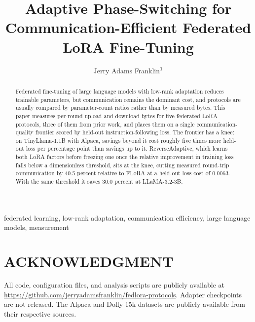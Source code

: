 \documentclass{ieeetj}
\def\authorrefmark#1{\ensuremath{^{\textbf{#1}}}}
\begin{document}

\title{Adaptive Phase-Switching for Communication-Efficient Federated LoRA Fine-Tuning}

\author{Jerry Adams Franklin\authorrefmark{1}}

\begin{abstract}
Federated fine-tuning of large language models with low-rank adaptation reduces trainable parameters, but communication remains the dominant cost, and protocols are usually compared by parameter-count ratios rather than by measured bytes. This paper measures per-round upload and download bytes for five federated LoRA protocols, three of them from prior work, and places them on a single communication-quality frontier scored by held-out instruction-following loss. The frontier has a knee: on TinyLlama-1.1B with Alpaca, savings beyond it cost roughly five times more held-out loss per percentage point than savings up to it. ReverseAdaptive, which learns both LoRA factors before freezing one once the relative improvement in training loss falls below a dimensionless threshold, sits at the knee, cutting measured round-trip communication by 40.5 percent relative to FLoRA at a held-out loss cost of 0.0063. With the same threshold it saves 30.0 percent at LLaMA-3.2-3B.
\end{abstract}

\begin{IEEEkeywords}
federated learning, low-rank adaptation, communication efficiency, large language models, measurement
\end{IEEEkeywords}

\maketitle



\section*{ACKNOWLEDGMENT}
All code, configuration
files, and analysis scripts are publicly available at
\url{https://github.com/jerryadamsfranklin/fedlora-protocols}. Adapter checkpoints are
not released. The Alpaca and Dolly-15k datasets are publicly available from
their respective sources.
\end{document}
